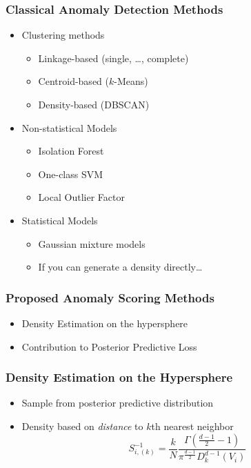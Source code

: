 \documentclass[aspectratio=169]{beamer}
\begin{document}
\begin{frame}
  \frametitle{Classical Anomaly Detection Methods}
  \begin{itemize}
    \item Clustering methods
      \begin{itemize}
        \item Linkage-based (single, \dots, complete)
        \item Centroid-based ($k$-Means)
        \item Density-based (DBSCAN)
      \end{itemize}
    \item Non-statistical Models
      \begin{itemize}
        \item Isolation Forest
        \item One-class SVM
        \item Local Outlier Factor
      \end{itemize}
    \item Statistical Models
      \begin{itemize}
        \item Gaussian mixture models
        \item If you can generate a density directly\dots
      \end{itemize}
  \end{itemize}
\end{frame}

\begin{frame}
  \frametitle{Proposed Anomaly Scoring Methods}
  \begin{itemize}
    \item Density Estimation on the hypersphere
    \item Contribution to Posterior Predictive Loss
  \end{itemize}
\end{frame}

\begin{frame}
  \frametitle{Density Estimation on the Hypersphere}
  \begin{itemize}
    \item Sample from posterior predictive distribution
    \item Density based on \emph{distance} to $k$th nearest neighbor
    \begin{equation*}
        S_{i,(k)}^{-1} =
          \frac{k}{N}\frac{\Gamma\left(\frac{d-1}{2} - 1\right)}{\pi^{\frac{d-1}{2}}D_{k}^{d-1}(V_i)}
    \end{equation*}
  \end{itemize}
\end{frame}
\end{document}

